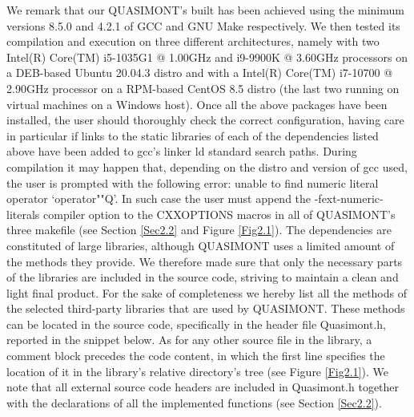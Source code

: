 \documentclass[a4paper, twosided]{book}
\begin{document}
\noindent
We remark that our QUASIMONT's built has been achieved using the minimum versions \colorbox{poliGrayBlue}{8.5.0} and \colorbox{poliGrayBlue}{4.2.1} of GCC and GNU Make respectively. We then tested its compilation and execution on three different architectures, namely with two Intel(R) Core(TM) i5-1035G1 @ 1.00GHz and i9-9900K @ 3.60GHz processors on a DEB-based \colorbox{poliGrayBlue}{Ubuntu 20.04.3} distro and with a Intel(R) Core(TM) i7-10700 @ 2.90GHz processor on a RPM-based \colorbox{poliGrayBlue}{CentOS 8.5} distro (the last two running on virtual machines on a Windows host). Once all the above packages have been installed, the user should thoroughly check the correct configuration, having care in particular if links to the static libraries of each of the dependencies listed above have been added to \colorbox{poliGrayBlue}{gcc}'s linker \colorbox{poliGrayBlue}{ld} standard search paths. During compilation it may happen that, depending on the distro and version of \colorbox{poliGrayBlue}{gcc} used, the user is prompted with the following \colorbox{poliGrayBlue}{error: unable to find numeric literal operator ‘operator""Q’}. In such case the user must append the \colorbox{poliGrayBlue}{-fext-numeric-literals} compiler option to the \colorbox{poliGrayBlue}{CXXOPTIONS} macros in all of QUASIMONT's three \colorbox{poliGrayBlue}{makefile} (see Section \ref{Sec2.2} and Figure \ref{Fig2.1}). The dependencies are constituted of large libraries, although QUASIMONT uses a limited amount of the methods they provide. We therefore made sure that only the necessary parts of the libraries are included in the source code, striving to maintain a clean and light final product. For the sake of completeness we hereby list all the methods of the selected third-party libraries  that are used by QUASIMONT.  These methods can be located in the source code, specifically in the header file \colorbox{poliGrayBlue}{Quasimont.h}, reported in the snippet below. As for any other source file in the library, a comment block precedes the code content, in which the first line specifies the location of it in the library's relative directory's tree (see Figure \ref{Fig2.1}).
We note that all external source code headers are included in \colorbox{poliGrayBlue}{Quasimont.h} together with the declarations of all the implemented functions (see Section \ref{Sec2.2}).

\newpage
\vspace{0.5cm}
\vspace{0.5cm}
\end{document}
